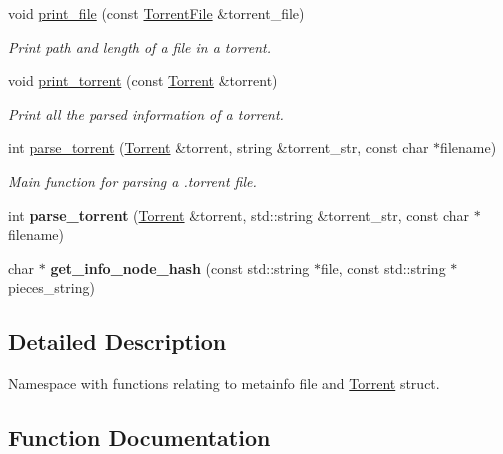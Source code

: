 \begin{DoxyCompactItemize}
void \hyperlink{namespacetorr_a86e0a9eb7815111ee9ab4b41e3edeca6}{print\+\_\+file} (const \hyperlink{structtorr_1_1TorrentFile}{Torrent\+File} \&torrent\+\_\+file)
\begin{DoxyCompactList}\small\item\em Print path and length of a file in a torrent. \end{DoxyCompactList}\item 
void \hyperlink{namespacetorr_a8f9d5e0b3e7590d0dd115cda74088eef}{print\+\_\+torrent} (const \hyperlink{structtorr_1_1Torrent}{Torrent} \&torrent)
\begin{DoxyCompactList}\small\item\em Print all the parsed information of a torrent. \end{DoxyCompactList}\item 
int \hyperlink{namespacetorr_aadd7f7bbd463cb3b941f548ffd3f7ee1}{parse\+\_\+torrent} (\hyperlink{structtorr_1_1Torrent}{Torrent} \&torrent, string \&torrent\+\_\+str, const char $\ast$filename)
\begin{DoxyCompactList}\small\item\em Main function for parsing a .torrent file. \end{DoxyCompactList}\item 
\mbox{\label{namespacetorr_ac7876733490126f221d2c476f770e9dd}} 
int {\bfseries parse\+\_\+torrent} (\hyperlink{structtorr_1_1Torrent}{Torrent} \&torrent, std\+::string \&torrent\+\_\+str, const char $\ast$filename)
\item 
\mbox{\label{namespacetorr_aea0adcfadf439eed53ca01a555855f04}} 
char $\ast$ {\bfseries get\+\_\+info\+\_\+node\+\_\+hash} (const std\+::string $\ast$file, const std\+::string $\ast$pieces\+\_\+string)
\end{DoxyCompactItemize}


\subsection{Detailed Description}
Namespace with functions relating to metainfo file and \hyperlink{structtorr_1_1Torrent}{Torrent} struct. 

\subsection{Function Documentation}
\mbox{\label{namespacetorr_ae283dfa60401ce3a0030abbc93508e88}} 
